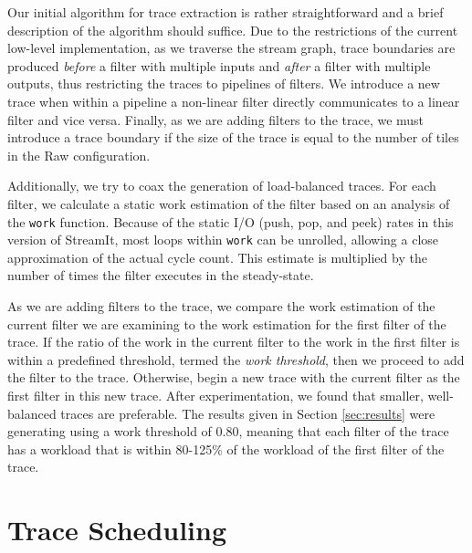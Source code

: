 Our initial algorithm for trace extraction is rather straightforward
and a brief description of the algorithm should suffice.  Due to the
restrictions of the current low-level implementation, as we traverse
the stream graph, trace boundaries are produced {\it before} a filter
with multiple inputs and {\it after} a filter with multiple outputs,
thus restricting the traces to pipelines of filters. We introduce a
new trace when within a pipeline a non-linear filter directly
communicates to a linear filter and vice versa. Finally, as we are
adding filters to the trace, we must introduce a trace boundary if the
size of the trace is equal to the number of tiles in the Raw
configuration.


Additionally, we try to coax the generation of load-balanced traces.
For each filter, we calculate a static work estimation of the filter
based on an analysis of the {\tt work} function.  Because of the
static I/O (push, pop, and peek) rates in this version of StreamIt,
most loops within {\tt work} can be unrolled, allowing a close
approximation of the actual cycle count.  This estimate is multiplied
by the number of times the filter executes in the steady-state.

As we are adding filters to the trace, we compare the work estimation
of the current filter we are examining to the work estimation for the
first filter of the trace.  If the ratio of the work in the current
filter to the work in the first filter is within a predefined
threshold, termed the {\it work threshold}, then we proceed to add the
filter to the trace.  Otherwise, begin a new trace with the current
filter as the first filter in this new trace.  After experimentation,
we found that smaller, well-balanced traces are preferable.  The
results given in Section \ref{sec:results} were generating using a
work threshold of 0.80, meaning that each filter of the trace has a
workload that is within 80-125\% of the workload of the first filter
of the trace.

\section{Trace Scheduling}